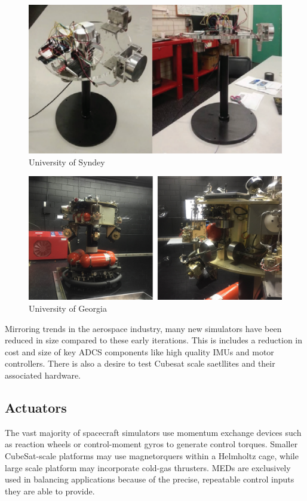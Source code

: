 \begin{figure}[h]
    \centering
    \includegraphics[width=0.80\linewidth]{figures/sydney.png}
    \caption{University of Syndey}
    \label{fig:sydney}
\end{figure}

\begin{figure}[h]
    \centering
    \includegraphics[width=0.80\linewidth]{figures/georgia.png}
    \caption{University of Georgia}
    \label{fig:georgia}
\end{figure}

Mirroring trends in the aerospace industry, many new simulators have been reduced in size compared to these early iterations. This is includes a reduction in cost and size of key ADCS components like high quality IMUs and motor controllers. There is also a desire to test Cubesat scale saetllites and their associated hardware.

\subsection{Actuators}

The vast majority of spacecraft simulators use momentum exchange devices such as reaction wheels or control-moment gyros to generate control torques. Smaller CubeSat-scale platforms may use magnetorquers within a Helmholtz cage, while large scale platform may incorporate cold-gas thrusters. MEDs are exclusively used in balancing applications because of the precise, repeatable control inputs they are able to provide. 

